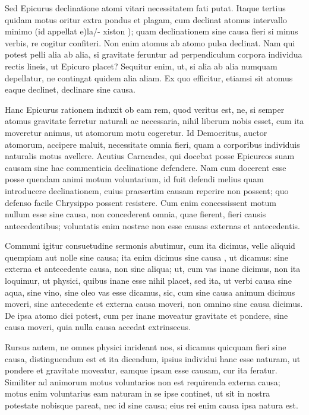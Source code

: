  Sed Epicurus declinatione atomi vitari necessitatem fati putat. Itaque tertius quidam motus oritur extra pondus et plagam, cum declinat atomus intervallo minimo (id appellat e)la/- xiston ); quam declinationem sine causa fieri si minus verbis, re cogitur confiteri. Non enim atomus ab atomo pulsa declinat. Nam qui potest pelli alia ab alia, si gravitate feruntur ad perpendiculum corpora individua rectis lineis, ut Epicuro placet? Sequitur enim, ut, si alia ab alia numquam depellatur, ne contingat quidem alia aliam. Ex quo efficitur, etiamsi sit atomus eaque declinet, declinare sine causa.

 Hanc Epicurus rationem induxit ob eam rem, quod veritus est, ne, si semper atomus gravitate ferretur naturali ac necessaria, nihil liberum nobis esset, cum ita moveretur animus, ut atomorum motu cogeretur. Id Democritus, auctor atomorum, accipere maluit, necessitate omnia fieri, quam a corporibus individuis naturalis motus avellere. Acutius Carneades, qui docebat posse Epicureos suam causam sine hac commenticia declinatione defendere. Nam cum docerent esse posse quendam animi motum voluntarium, id fuit defendi melius quam introducere declinationem, cuius praesertim causam reperire non possent; quo defenso facile Chrysippo possent resistere. Cum enim concessissent motum nullum esse sine causa, non concederent omnia, quae fierent, fieri causis antecedentibus; voluntatis enim nostrae non esse causas externas et antecedentis.

 Communi igitur consuetudine sermonis abutimur, cum ita dicimus, velle aliquid quempiam aut nolle sine causa; ita enim dicimus sine causa , ut dicamus: sine externa et antecedente causa, non sine aliqua; ut, cum vas inane dicimus, non ita loquimur, ut physici, quibus inane esse nihil placet, sed ita, ut verbi causa sine aqua, sine vino, sine oleo vas esse dicamus, sic, cum sine causa animum dicimus moveri, sine antecedente et externa causa moveri, non omnino sine causa dicimus. De ipsa atomo dici potest, cum per inane moveatur gravitate et pondere, sine causa moveri, quia nulla causa accedat extrinsecus.

 Rursus autem, ne omnes physici inrideant nos, si dicamus quicquam fieri sine causa, distinguendum est et ita dicendum, ipsius individui hanc esse naturam, ut pondere et gravitate moveatur, eamque ipsam esse causam, cur ita feratur. Similiter ad animorum motus voluntarios non est requirenda externa causa; motus enim voluntarius eam naturam in se ipse continet, ut sit in nostra potestate nobisque pareat, nec id sine causa; eius rei enim causa ipsa natura est.

